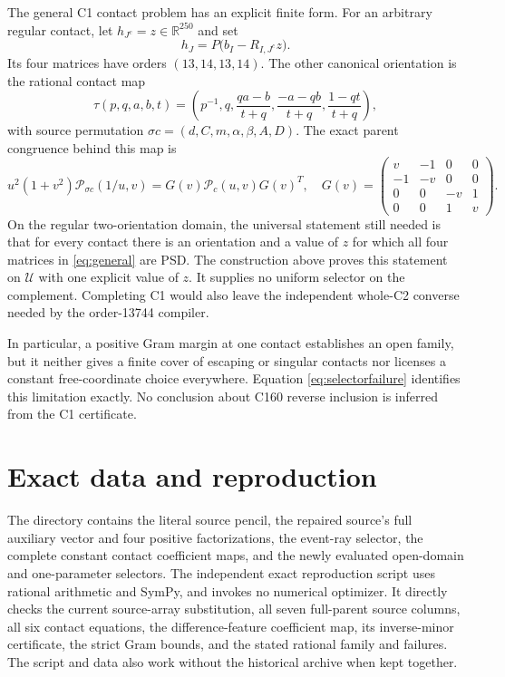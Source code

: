 \documentclass[11pt]{article}
\newcommand{\R}{\mathbb R}
\begin{document}
The general C1 contact problem has an explicit finite form.  For an
arbitrary regular contact, let $h_{J^c}=z\in\R^{250}$ and set
\begin{equation}
 h_J=P\bigl(b_I-R_{I,J^c}z\bigr).
 \label{eq:general}
\end{equation}
Its four matrices have orders $(13,14,13,14)$.  The other canonical
orientation is the rational contact map
\begin{equation}
 \tau(p,q,a,b,t)=\left(p^{-1},q,
       \frac{qa-b}{t+q},\frac{-a-qb}{t+q},\frac{1-qt}{t+q}\right),
 \label{eq:reflection}
\end{equation}
with source permutation
$\sigma c=(d,C,m,\alpha,\beta,A,D)$.
The exact parent congruence behind this map is
\[
 u^2(1+v^2)\mathcal P_{\sigma c}(1/u,v)
     =G(v)\mathcal P_c(u,v)G(v)^T,
\quad
G(v)=\begin{pmatrix}v&-1&0&0\\-1&-v&0&0\\
0&0&-v&1\\0&0&1&v\end{pmatrix}.
\]
On the regular two-orientation domain, the universal statement still
needed is that for every contact there is an orientation and a value
of $z$ for which all four matrices in \eqref{eq:general} are PSD.
The construction above proves this statement on $\mathcal U$ with one
explicit value of $z$.  It supplies no uniform selector on the
complement.  Completing C1 would also leave the independent whole-C2
converse needed by the order-13744 compiler.

In particular, a positive Gram margin at one contact establishes an
open family, but it neither gives a finite cover of escaping or singular
contacts nor licenses a constant free-coordinate choice everywhere.
Equation \eqref{eq:selectorfailure} identifies this limitation exactly.
No conclusion about C160 reverse inclusion is inferred from the C1
certificate.

\section*{Exact data and reproduction}

The directory  contains the literal
source pencil, the repaired source's full auxiliary vector and four
positive factorizations, the event-ray selector, the complete constant
contact coefficient maps, and the newly evaluated open-domain and
one-parameter selectors.  The independent exact reproduction script
 uses rational arithmetic and
SymPy, and invokes no numerical optimizer.  It directly checks the
current source-array substitution, all seven full-parent source
columns, all six contact equations, the difference-feature coefficient
map, its inverse-minor certificate, the strict Gram bounds, and the
stated rational family and failures.  The script and data also work
without the historical archive when kept together.
\end{document}
